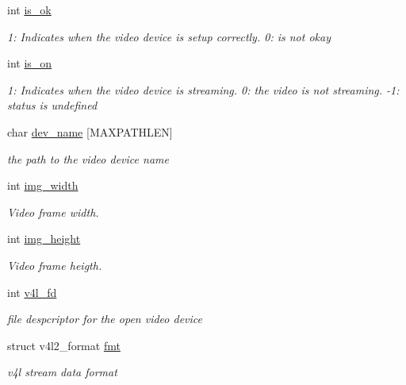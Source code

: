 \begin{DoxyCompactItemize}
\item 
int \hyperlink{structvideo__params__s_a244777435afe8e2ffd40d1919e47abcb}{is\-\_\-ok}
\begin{DoxyCompactList}\small\item\em 1\-: \-Indicates when the video device is setup correctly. 0\-: is not okay \end{DoxyCompactList}\item 
int \hyperlink{structvideo__params__s_a09a2674567a028e8984acac16ccc8a8f}{is\-\_\-on}
\begin{DoxyCompactList}\small\item\em 1\-: \-Indicates when the video device is streaming. 0\-: the video is not streaming. -\/1\-: status is undefined \end{DoxyCompactList}\item 
char \hyperlink{structvideo__params__s_a7c8bdb370066b647e33e0a84bbca5911}{dev\-\_\-name} \mbox{[}\-M\-A\-X\-P\-A\-T\-H\-L\-E\-N\mbox{]}
\begin{DoxyCompactList}\small\item\em the path to the video device name \end{DoxyCompactList}\item 
int \hyperlink{structvideo__params__s_a8da7922c30e29e54fa97380d1c957a18}{img\-\_\-width}
\begin{DoxyCompactList}\small\item\em \-Video frame width. \end{DoxyCompactList}\item 
int \hyperlink{structvideo__params__s_aff04696ffc57cb0ae2676fe9e3ffe354}{img\-\_\-height}
\begin{DoxyCompactList}\small\item\em \-Video frame heigth. \end{DoxyCompactList}\item 
int \hyperlink{structvideo__params__s_a5ad62fa189f34607d1dbb4e693a81cfd}{v4l\-\_\-fd}
\begin{DoxyCompactList}\small\item\em file despcriptor for the open video device \end{DoxyCompactList}\item 
struct v4l2\-\_\-format \hyperlink{structvideo__params__s_a10f56a8af702f24871d7dff8745380fe}{fmt}
\begin{DoxyCompactList}\small\item\em v4l stream data format \end{DoxyCompactList}\item 

\end{DoxyCompactItemize}

